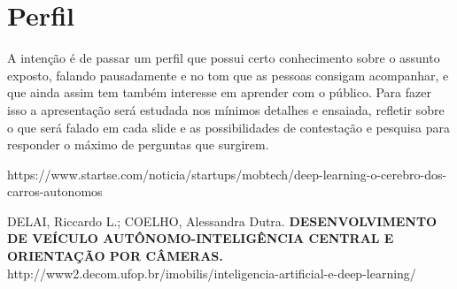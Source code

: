 \documentclass[12pt,a4paper]{article}
\begin{document}
    \section{Perfil}
    \par A intenção é de passar um perfil que possui certo conhecimento sobre o assunto exposto, falando pausadamente e no tom que as pessoas consigam acompanhar, e que ainda assim tem também interesse em aprender com o público. Para fazer isso a apresentação será estudada nos mínimos detalhes e ensaiada, refletir sobre o que será falado em cada slide e as possibilidades de contestação e pesquisa para responder o máximo de perguntas que surgirem.


     
    \begin{thebibliography}{BIBLIOGRAFIA}

         https://www.startse.com/noticia/startups/mobtech/deep-learning-o-cerebro-dos-carros-autonomos
 
         DELAI, Riccardo L.; COELHO, Alessandra Dutra. \textbf{DESENVOLVIMENTO DE VEÍCULO AUTÔNOMO-INTELIGÊNCIA CENTRAL E ORIENTAÇÃO POR CÂMERAS.}
         http://www2.decom.ufop.br/imobilis/inteligencia-artificial-e-deep-learning/
    
    \end{thebibliography}





\end{document}
